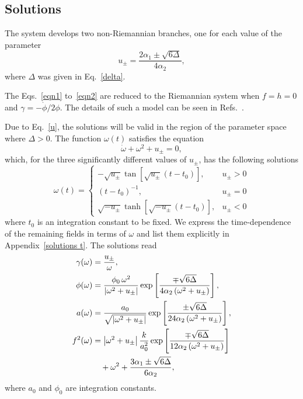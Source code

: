 \documentclass[aps,prd,12pt,superscriptaddress,showpacs,showkeys,reprint,nofootinbib]{revtex4-1}
\begin{document}
\subsection{Solutions\label{sec:sol}}

The system develops two non-Riemannian branches, one for each value of the parameter
\begin{equation}
  \label{u}
  u_\pm=\frac{2\alpha_1\pm\sqrt{6\Delta}}{4\alpha_2},
\end{equation}
where $\Delta$ was given in Eq.~\eqref{delta}.

The Eqs.~\eqref{eqn1} to~\eqref{eqn2} are reduced to the Riemannian system when \mbox{$f=h=0$} and \mbox{$\gamma=-\dot{\phi}/2\phi$}. The details of such a model can be seen in Refs.~\cite{Deruelle:1986iv,Deruelle:2003ck,Henriques:1986jw,*Ishihara:1986if,Kleidis:1997mu,Canfora:2016umq}.

Due to Eq.~\eqref{u}, the solutions will be valid in the region of the parameter space where $\Delta>0$. The function $\omega(t)$ satisfies the equation
\begin{equation}
  \dot{\omega}+\omega^2+u_{\pm} = 0,
\end{equation}
which, for the three significantly different values of $u_\pm$, has the following solutions
\begin{equation}
  \omega(t) =
  \begin{cases}
    -\sqrt{u_\pm}\tan\left[\sqrt{u_\pm}\left(t-t_0\right)\right], & u_\pm > 0 \\
    \left(t-t_0\right)^{-1}, & u_\pm = 0 \\
    \sqrt{-u_\pm}\tanh\left[\sqrt{-u_\pm}\left(t-t_0\right)\right], & u_\pm < 0
  \end{cases}
\end{equation}
where $t_0$ is an integration constant to be fixed. We express the time-dependence of the remaining fields in terms of $\omega$ and list them explicitly in Appendix~\ref{solutions t}. The solutions read
\begin{align}
  \gamma(\omega)&=\frac{u_\pm}{\omega},\\
  \phi(\omega)&=\frac{\phi_0\,\omega^2}{\left|\omega^2+u_\pm\right|}\exp\left[\frac{\mp\sqrt{6\Delta}}{4\alpha_2\left(\omega^2+u_\pm\right)}\right],\\
  a(\omega)&=\frac{a_0}{\sqrt{\left|\omega^2+u_\pm\right|}}\exp\left[\frac{\pm\sqrt{6\Delta}} {24\alpha_2\left(\omega^2+u_\pm\right)}\right],\\
  \label{f2sol}
  f^2(\omega)&=\left|\omega^2+u_\pm\right|\frac{k}{a_0^2}\exp\left[\frac{\mp\sqrt{6\Delta}}{12\alpha_2\left(\omega^2+u_\pm\right)}\right]\notag\\
  & \quad +\omega^2  + \frac{3\alpha_1\pm\sqrt{6\Delta}}{6\alpha_2},
\end{align}
where $a_0$ and $\phi_0$ are integration constants. 
\end{document}
